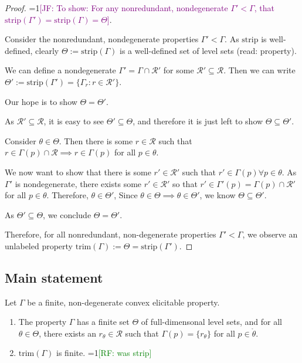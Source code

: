 \documentclass[12pt]{article}
\newcommand{\Comments}{1}
\newcommand{\mynote}[2]{\ifnum\Comments=1\textcolor{#1}{#2}\fi}
\newcommand{\raf}[1]{\mynote{green}{[RF: #1]}}
\newcommand{\jessie}[1]{\mynote{purple}{[JF: #1]}}
\newcommand{\R}{\mathcal{R}}
\newcommand{\inter}[1]{\mathring{#1}}%
\newcommand{\trim}{\mathrm{trim}}
\newcommand{\strip}{\text{strip}}
\begin{document}
\begin{proof}
\jessie{To show:  For any nonredundant, nondegenerate $\Gamma' < \Gamma$, that $\strip(\Gamma') = \strip(\Gamma) = \Theta$}.

Consider the nonredundant, nondegenerate properties $\Gamma' < \Gamma$.
As $\strip$ is well-defined, clearly $\Theta := \strip(\Gamma)$ is a well-defined set of level sets (read: property).

We can define a nondegenerate $\Gamma' = \Gamma \cap \R'$ for some $\R' \subseteq \R$.
Then we can write $\Theta' := \strip(\Gamma') = \{\Gamma_r : r \in \R' \}$.

Our hope is to show $\Theta = \Theta'$.

As $\R' \subseteq \R$, it is easy to see  $\Theta' \subseteq \Theta$, and therefore it is just left to show $\Theta \subseteq \Theta'$.

Consider $\theta \in \Theta$.
Then there is some $r \in \R$ such that $r\in\Gamma(p)\cap \R \implies r \in \Gamma(p)$ for all $p \in \theta$.

We now want to show that there is some $r' \in \R'$ such that $r' \in \Gamma(p) \forall p \in \theta$.
As $\Gamma'$ is nondegenerate, there exists some $r' \in \R'$ so that $r' \in \Gamma'(p) = \Gamma(p) \cap \R'$ for all $p \in \theta$.
Therefore, $\theta \in \Theta'$,
Since $\theta \in \Theta \implies \theta \in \Theta'$, we know $\Theta \subseteq \Theta'$.

As $\Theta' \subseteq \Theta$, we conclude $\Theta = \Theta'$.

Therefore, for all nonredundant, non-degenerate properties $\Gamma' < \Gamma$, we observe an unlabeled property $\trim(\Gamma) := \Theta = \strip(\Gamma')$.
\end{proof}


\subsection{Main statement}

Let $\Gamma$ be a finite, non-degenerate convex elicitable property.

\begin{enumerate}
\item The property $\Gamma$ has a finite set $\Theta$ of full-dimensonal level sets, and for all $\theta \in \Theta$, there exists an $r_\theta \in \R$ such that $\Gamma(p) = \{r_\theta\}$ for all $p \in \inter{\theta}$.
\item $\text{trim}(\Gamma)$ is finite.  \raf{was strip}
\end{enumerate}
\end{document}
